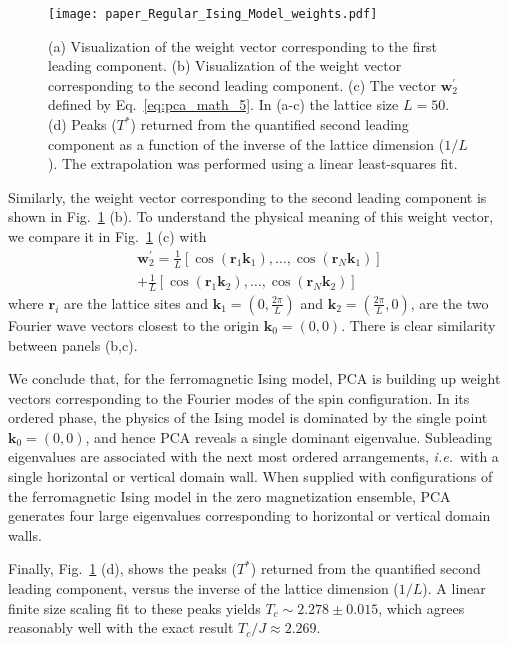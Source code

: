 \documentclass[pra,letterpaper,10pt,twocolumn]{revtex4}
\begin{document}
\begin{figure}[!h]
\texttt{[image: paper\_Regular\_Ising\_Model\_weights.pdf]} 
\caption{
(a) Visualization of the weight vector corresponding to the first leading
component.  (b) Visualization of the weight vector corresponding
to the second leading component.  
(c) The vector $\mathbf{w}^{\prime}_2$ defined by
Eq.~\ref{eq:pca_math_5}.
In (a-c) the lattice size $L=50$. 
(d) Peaks ($T^*$)
returned from the quantified second leading component as a function of
the inverse of the lattice dimension ($1/L$). The extrapolation was
performed using a linear least-squares fit. 
\label{fig:Regular_Ising_Model_weights}
}
\end{figure}

Similarly, the weight vector corresponding to the second leading component is
shown in Fig.~\ref{fig:Regular_Ising_Model_weights} (b). To
understand the physical meaning of this weight vector, we compare it
in Fig.~\ref{fig:Regular_Ising_Model_weights} (c) with
\begin{align}
{\mathbf{w}}^{\prime}_{2} = \frac{1}{L}[\cos(\mathbf{r}_1\mathbf{k}_1), \dots, \cos(\mathbf{r}_N\mathbf{k}_1)] \nonumber \\
+\frac{1}{L}[\cos(\mathbf{r}_1\mathbf{k}_2), \dots, \cos(\mathbf{r}_N\mathbf{k}_2)]
\label{eq:pca_math_5}
\end{align}
where $\mathbf{r}_i$
are the lattice sites and
$\mathbf{k}_1=(0, \frac{2\pi}{L})$ and $\mathbf{k}_2=(\frac{2\pi}{L}, 0)$,
are the two Fourier wave vectors closest to the origin
$\mathbf{k}_0=(0,0)$.
There is clear similarity between panels (b,c).

We conclude that, for the ferromagnetic Ising model, PCA is building up
weight vectors corresponding to the Fourier modes of the spin
configuration.  In its ordered phase, the physics of the Ising model is
dominated by the single point $\mathbf{k}_0=(0,0)$, and hence PCA
reveals a single dominant eigenvalue.  Subleading eigenvalues are
associated with the next most ordered arrangements, {\it i.e.}~with a
single horizontal or vertical domain wall.  When supplied with
configurations of the ferromagnetic Ising model in the zero
magnetization ensemble, PCA generates four large eigenvalues
corresponding to horizontal or vertical domain walls\cite{Wang}.

Finally, Fig.~\ref{fig:Regular_Ising_Model_weights} (d), shows the peaks
($T^*$) returned from the quantified second leading component, versus
the inverse of the lattice dimension ($1/L$).  A linear finite size
scaling fit to these peaks yields $T_c \sim 2.278 \pm 0.015$, which
agrees reasonably well with the exact result $T_c/J \approx 2.269$. 
\end{document}
